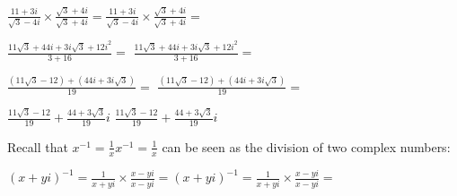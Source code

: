 \documentclass[12pt, a4paper]{report}
\theoremstyle{plain}
\theoremstyle{definition}
\theoremstyle{remark}
\begin{document}
${\displaystyle {\frac {11+3i}{{\sqrt {3}}-4i}}\times {\frac {{\sqrt {3}}+4i}{{\sqrt {3}}+4i}}=} {\displaystyle {\frac {11+3i}{{\sqrt {3}}-4i}}\times {\frac {{\sqrt {3}}+4i}{{\sqrt {3}}+4i}}=}$

${\displaystyle {\frac {11{\sqrt {3}}+44i+3i{\sqrt {3}}+12i^{2}}{3+16}}=}$ ${\displaystyle {\frac {11{\sqrt {3}}+44i+3i{\sqrt {3}}+12i^{2}}{3+16}}=}$

${\displaystyle {\frac {(11{\sqrt {3}}-12)+(44i+3i{\sqrt {3}})}{19}}=}$ ${\displaystyle {\frac {(11{\sqrt {3}}-12)+(44i+3i{\sqrt {3}})}{19}}=}$

${\displaystyle {\frac {11{\sqrt {3}}-12}{19}}+{\frac {44+3{\sqrt {3}}}{19}}i}$ 
${\displaystyle {\frac {11{\sqrt {3}}-12}{19}}+{\frac {44+3{\sqrt {3}}}{19}}i}$


Recall that ${\displaystyle x^{-1}={\frac {1}{x}}} {\displaystyle x^{-1}={\frac {1}{x}}}$ can be seen as the division of two complex numbers:

${\displaystyle {(x+yi)}^{-1}={\frac {1}{x+yi}}\times {\frac {x-yi}{x-yi}}=} {\displaystyle {(x+yi)}^{-1}={\frac {1}{x+yi}}\times {\frac {x-yi}{x-yi}}=}$
\end{document}
